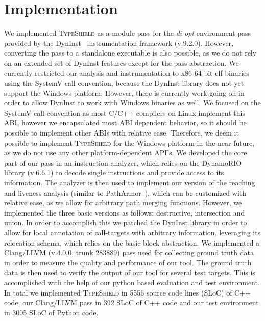 \section{Implementation}
\label{chapter:Implementation}

We implemented \textsc{TypeShield} as a module pass for the \textit{di-opt} environment pass provided by the 
DynInst~\cite{bernat:dyninst} instrumentation framework (v.9.2.0). 
However, converting the pass to a standalone executable is also possible, as we do not rely on an extended set of DynInst features
except for the pass abstraction.
We currently restricted our analysis and instrumentation to x86-64 bit elf 
binaries using the SystemV call convention, because the DynInst library does not yet support the
Windows platform. However, there is currently work going on in order to allow DynInst to work with
Windows binaries as well. We focused on the SystemV call convention as most C/C++ compilers
on Linux implement this ABI, however we encapsulated most ABI dependent behavior, so it should 
be possible to implement other ABIs with relative ease. Therefore, we deem it possible to implement
\textsc{TypeShield} for the Windows platform in the near future, as we do not use any other 
platform-dependent API's. 
We developed the core part of our pass in an instruction analyzer, which relies on the DynamoRIO~\cite{dynamorio:drmemory} library 
(v.6.6.1) to decode single instructions and provide access to its information. The analyzer is then
used to implement our version of the reaching and liveness analysis (similar to PathArmor~\cite{veen:typearmor}), which can
be customized with relative ease, as we allow for arbitrary path merging functions. However, we implemented 
the three basic versions as follows: destructive, intersection and union.
In order to accomplish this we patched the DynInst library in order to allow for local annotation of call-targets with arbitrary
information, leveraging its relocation schema, which relies on the basic block abstraction.
We implemented a Clang/LLVM (v.4.0.0, trunk 283889) pass used for 
collecting ground truth data in order to measure the quality and performance of our tool. 
The ground truth data is then used to verify the output of our tool for several test targets. 
This is accomplished with the help of our python based evaluation and test environment.
In total we implemented \textsc{TypeShield} in 5556 source code lines (SLoC) of C++ code, our Clang/LLVM pass in 392 SLoC
of C++ code and our test environment in 3005 SLoC of Python code. 


